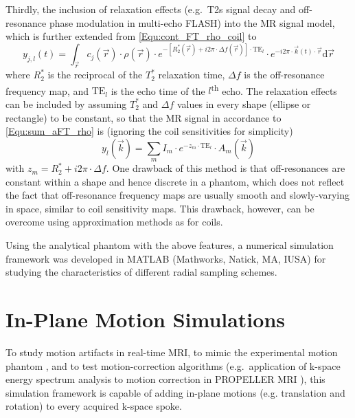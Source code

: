 Thirdly, the inclusion of relaxation effects (e.g.~\acs{T2s} signal decay and off-resonance phase modulation in multi-echo FLASH) into the MR signal model, which is further extended from \cref{Equ:cont_FT_rho_coil} to
\begin{equation} \label{Equ:cont_FT_rho_coil_ME}
  y_{j,l}(t) = \int_{\vec{r}} c_j(\vec{r}) \cdot \rho(\vec{r}) \cdot e^{-[R_2^*(\vec{r}) + i 2\pi \cdot \Delta f (\vec{r})] \cdot \text{TE}_l} \cdot e^{-i 2\pi \cdot \vec{k}(t) \cdot \vec{r}} \text{d} \vec{r}
\end{equation}
where $R_2^*$ is the reciprocal of the $T_2^*$ relaxation time, $\Delta f$ is the off-resonance frequency map, and $\text{TE}_l$ is the echo time of the $l$\textsuperscript{th} echo. The relaxation effects can be included by assuming $T_2^*$ and $\Delta f$ values in every shape (ellipse or rectangle) to be constant, so that the MR signal in accordance to \cref{Equ:sum_aFT_rho} is (ignoring the coil sensitivities for simplicity)
\begin{equation} \label{Equ:sum_aFT_rho_relax}
  y_l(\vec{k}) = \sum_{m} I_m \cdot e^{-z_m \cdot \text{TE}_l} \cdot A_m(\vec{k})
\end{equation}
with $z_m = R_2^* + i 2\pi \cdot \Delta f$. One drawback of this method is that off-resonances are constant within a shape and hence discrete in a phantom, which does not reflect the fact that off-resonance frequency maps are usually smooth and slowly-varying in space, similar to coil sensitivity maps. This drawback, however, can be overcome using approximation methods as for coils.

Using the analytical phantom with the above features, a numerical simulation framework was developed in MATLAB (Mathworks, Natick, MA, IUSA) for studying the characteristics of different radial sampling schemes.

\section{In-Plane Motion Simulations}
To study motion artifacts in real-time MRI, to mimic the experimental motion phantom \cite{2013_MotionPha}, and to test motion-correction algorithms (e.g.~application of k-space energy spectrum analysis to motion correction in \acs{PROPELLER} MRI \cite{2006_KESA,2012_KESA_Tan}), this simulation framework is capable of adding in-plane motions (e.g. translation and rotation) to every acquired k-space spoke. 

